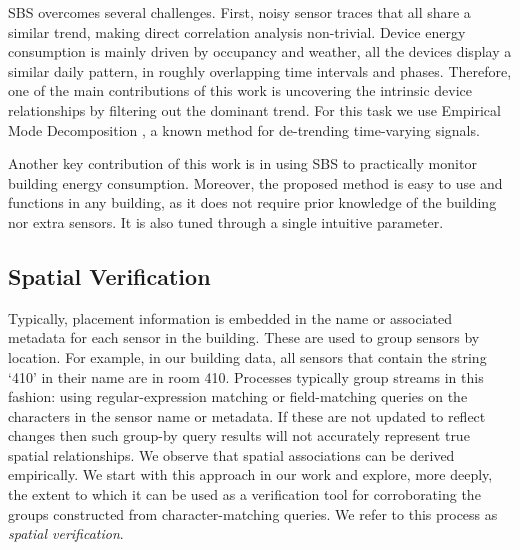 SBS overcomes several challenges.  First, 
noisy sensor traces that all share a similar trend, making direct correlation analysis non-trivial.
Device energy consumption is mainly driven by occupancy and weather, all the devices display a similar daily pattern, in 
roughly overlapping time intervals and phases.
Therefore, one of the main contributions of this work is uncovering the intrinsic device relationships by filtering out the 
dominant trend.  For this task we use 
Empirical Mode Decomposition \cite{huang:emd1998}, a known method for de-trending time-varying signals.

Another key contribution of this work is in using SBS to practically monitor building energy consumption.
Moreover, the proposed method is easy to use and functions in any building, as it does not require prior knowledge of the building nor extra sensors.  
It is also tuned through a single intuitive parameter.  %



\subsection{Spatial Verification}

Typically, placement information is embedded in the name or associated metadata for each sensor in the building.
These are used to group sensors by location.  For example, in our building data, all sensors that contain the string
 `410' in their name are in room 410.  Processes typically group streams in this fashion: using regular-expression matching 
or field-matching queries on the characters in the sensor name or metadata.  If these are not updated to reflect changes
then such group-by query results will not accurately represent true spatial relationships.  
We observe that spatial associations can be derived empirically.  We start with this approach in our 
work and explore, more deeply, the extent to which it can be used 
as a verification tool for corroborating the groups constructed from character-matching queries.  We refer
to this process as \emph{spatial verification}.


